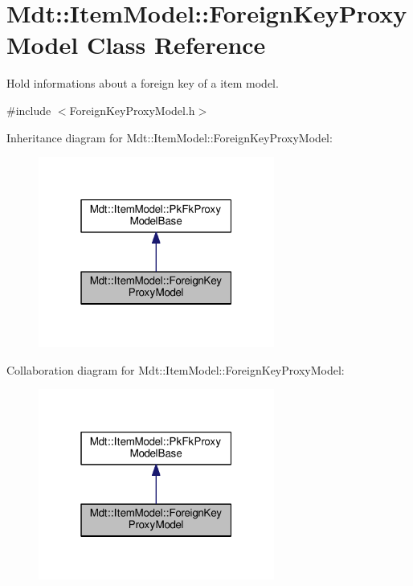 \hypertarget{class_mdt_1_1_item_model_1_1_foreign_key_proxy_model}{}\section{Mdt\+:\+:Item\+Model\+:\+:Foreign\+Key\+Proxy\+Model Class Reference}
\label{class_mdt_1_1_item_model_1_1_foreign_key_proxy_model}


Hold informations about a foreign key of a item model.  




{\ttfamily \#include $<$Foreign\+Key\+Proxy\+Model.\+h$>$}



Inheritance diagram for Mdt\+:\+:Item\+Model\+:\+:Foreign\+Key\+Proxy\+Model\+:\nopagebreak
\begin{figure}[H]
\begin{center}
\leavevmode
\includegraphics[width=220pt]{class_mdt_1_1_item_model_1_1_foreign_key_proxy_model__inherit__graph}
\end{center}
\end{figure}


Collaboration diagram for Mdt\+:\+:Item\+Model\+:\+:Foreign\+Key\+Proxy\+Model\+:\nopagebreak
\begin{figure}[H]
\begin{center}
\leavevmode
\includegraphics[width=220pt]{class_mdt_1_1_item_model_1_1_foreign_key_proxy_model__coll__graph}
\end{center}
\end{figure}
